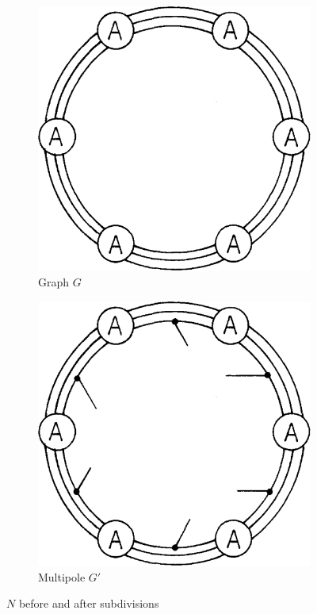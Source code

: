 \documentclass[12pt, twoside]{book}
\begin{document}
\begin{example}
	\begin{figure}
		\centering
		\begin{subfigure}[b]{0.45\textwidth}
			\centering
			\includegraphics[width=\textwidth]{images/Kochol-article/Kochol-before-subdivisions}
			\caption{Graph $G$}
			\label{fig:Kochol-before-subdivisions}
		\end{subfigure}
		\hfill
		\begin{subfigure}[b]{0.45\textwidth}
			\centering
			\includegraphics[width=\textwidth]{images/Kochol-article/Kochol-after-subdivisions}
			\caption{Multipole $G'$}
			\label{fig:Kochol-after-subdivisions}
		\end{subfigure}
		\caption{$N$ before and after subdivisions}
	\end{figure}
	

\end{example}
\end{document}
